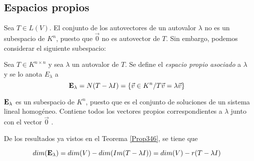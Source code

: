 \bigskip

\subsection{Espacios propios}
\label{espprop}


Sea $T\in L(V)$. El conjunto de los autovectores de un autovalor $\lambda$ no es un subespacio de $K^n$, puesto que $\vec{0}$  no es autovector de $T$. Sin embargo, podemos considerar el siguiente subespacio:

\bigskip


\begin{definition}\label{esppropio}
Sea $T  \in K^{n \times n}$ y sea $\lambda$ un autovalor de $T$. Se define el \textit{espacio propio asociado } a $\lambda$ y se lo anota $E_\lambda$ a
\begin{equation}
\label{espaciopropio}
 \bold E_\lambda  =N(T-\lambda I)=\{\vec{v} \in K^n /T \vec{v}=  \lambda \vec{v}\}   
\end{equation}

\end{definition}


\bigskip


$\bold E_\lambda$ es un subespacio de $K^n$, puesto que es el conjunto de soluciones de un sistema lineal homogéneo. Contiene todos los vectores propios correspondientes a $\lambda$ junto con el vector $\vec{0}$ .


\bigskip


De los resultados ya vistos en el Teorema \ref{Prop346}, se tiene que

$$dim(\bold E_\lambda)=dim(V)-dim(Im(T-\lambda I))=dim(V)-r(T-\lambda I)$$

\bigskip



